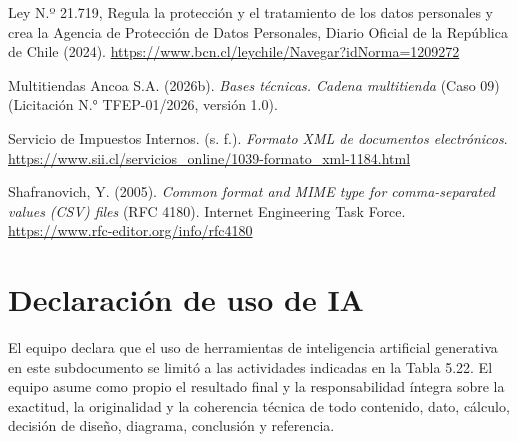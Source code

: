 \documentclass[11pt]{article}
\begin{document}
Ley N.º 21.719, Regula la protección y el tratamiento de los datos personales y crea la Agencia de Protección de Datos Personales, Diario Oficial de la República de Chile (2024). \url{https://www.bcn.cl/leychile/Navegar?idNorma=1209272}


Multitiendas Ancoa S.A. (2026b). \textit{Bases técnicas. Cadena multitienda} (Caso 09) (Licitación N.° TFEP-01/2026, versión 1.0).


Servicio de Impuestos Internos. (s. f.). \textit{Formato XML de documentos electrónicos}. \url{https://www.sii.cl/servicios_online/1039-formato_xml-1184.html}

Shafranovich, Y. (2005). \textit{Common format and MIME type for comma-separated values (CSV) files} (RFC 4180). Internet Engineering Task Force. \url{https://www.rfc-editor.org/info/rfc4180}

\section*{Declaración de uso de IA}

El equipo declara que el uso de herramientas de inteligencia artificial generativa en este subdocumento se limitó a las actividades indicadas en la Tabla 5.22. El equipo asume como propio el resultado final y la responsabilidad íntegra sobre la exactitud, la originalidad y la coherencia técnica de todo contenido, dato, cálculo, decisión de diseño, diagrama, conclusión y referencia.
\end{document}
